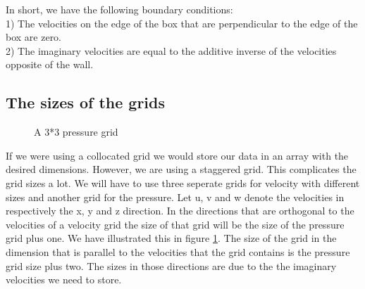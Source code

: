 \documentclass{article}
\begin{document}
In short, we have the following boundary conditions: \\
1) The velocities on the edge of the box that are perpendicular to the edge of the box are zero.\\
2) The imaginary velocities are equal to the additive inverse of the velocities opposite of the wall.

\newpage
\subsection{The sizes of the grids} \label{The sizes of the grids}
\begin{figure}[ht]
\centering
\caption{A 3*3 pressure grid}
\label{grid sizes}
\end{figure}

If we were using a collocated grid we would store our data in an array with the desired dimensions. However, we are using a staggered grid. This complicates the grid sizes a lot. We will have to use three seperate grids for velocity with different sizes and another grid for the pressure. Let u, v and w denote the velocities in respectively the x, y and z direction.  In the directions that are orthogonal to the velocities of a velocity grid the size of that grid will be the size of the pressure grid plus one. We have illustrated this in figure \ref{grid sizes}. The size of the grid in the dimension that is parallel to the velocities that the grid contains is the pressure grid size plus two. The sizes in those directions are due to the the imaginary velocities we need to store.

\newpage
\end{document}
